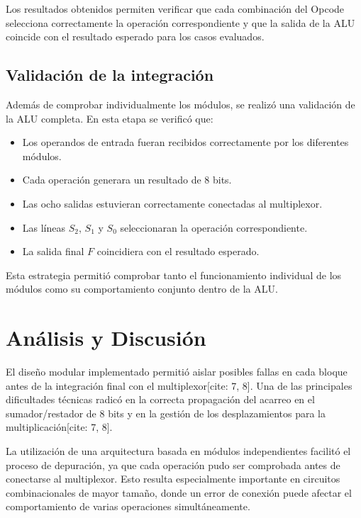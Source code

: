 \documentclass[12pt,a4paper]{article}
\begin{document}
Los resultados obtenidos permiten verificar que cada combinación del Opcode selecciona correctamente la operación correspondiente y que la salida de la ALU coincide con el resultado esperado para los casos evaluados.

\subsection{Validación de la integración}

Además de comprobar individualmente los módulos, se realizó una validación de la ALU completa. En esta etapa se verificó que:

\begin{itemize}
    \item Los operandos de entrada fueran recibidos correctamente por los diferentes módulos.
    \item Cada operación generara un resultado de 8 bits.
    \item Las ocho salidas estuvieran correctamente conectadas al multiplexor.
    \item Las líneas $S_2$, $S_1$ y $S_0$ seleccionaran la operación correspondiente.
    \item La salida final $F$ coincidiera con el resultado esperado.
\end{itemize}

Esta estrategia permitió comprobar tanto el funcionamiento individual de los módulos como su comportamiento conjunto dentro de la ALU.

\section{Análisis y Discusión}

El diseño modular implementado permitió aislar posibles fallas en cada bloque antes de la integración final con el multiplexor[cite: 7, 8]. Una de las principales dificultades técnicas radicó en la correcta propagación del acarreo en el sumador/restador de 8 bits y en la gestión de los desplazamientos para la multiplicación[cite: 7, 8].

La utilización de una arquitectura basada en módulos independientes facilitó el proceso de depuración, ya que cada operación pudo ser comprobada antes de conectarse al multiplexor. Esto resulta especialmente importante en circuitos combinacionales de mayor tamaño, donde un error de conexión puede afectar el comportamiento de varias operaciones simultáneamente.
\end{document}
